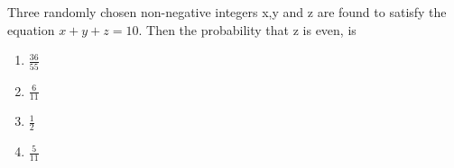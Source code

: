 \item Three randomly chosen non-negative integers x,y and z are found to satisfy the equation $x+y+z=10$. Then the probability that z is even, is
\begin{multicols}{4}
\begin{enumerate}
    \item $\frac{36}{55}$
    \item $\frac{6}{11}$
    \item $\frac{1}{2}$
    \item $\frac{5}{11}$
\end{enumerate}
\end{multicols}

